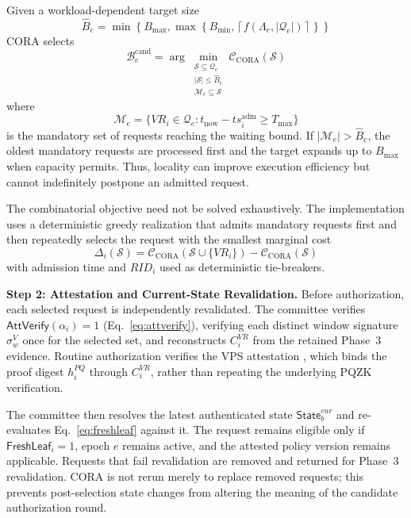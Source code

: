 \documentclass[lettersize,journal]{IEEEtran}
\begin{document}
Given a workload-dependent target size
\begin{equation}
\widehat{B}_e
=
\min\!\left\{
B_{\max},
\max\!\left\{
B_{\min},
\left\lceil
f(\Lambda_e,|\mathcal{Q}_e|)
\right\rceil
\right\}
\right\}
\end{equation}
CORA selects
\begin{equation}
\mathcal{B}_e^{\mathrm{cand}}
=
\arg\min_{\substack{
\mathcal{S}\subseteq\mathcal{Q}_e\\
|\mathcal{S}|\leq\widehat{B}_e\\
\mathcal{M}_e\subseteq\mathcal{S}
}}
\mathcal{C}_{\mathrm{CORA}}(\mathcal{S})
\end{equation}
where
\begin{equation}
\mathcal{M}_e=
\{VR_i\in\mathcal{Q}_e:
t_{\mathrm{now}}-ts_i^{\mathrm{adm}}\geq T_{\max}\}
\end{equation}
is the mandatory set of requests reaching the waiting bound. If
$|\mathcal{M}_e|>\widehat{B}_e$, the oldest mandatory requests are
processed first and the target expands up to $B_{\max}$ when capacity
permits. Thus, locality can improve execution efficiency but cannot
indefinitely postpone an admitted request.

The combinatorial objective need not be solved exhaustively. The
implementation uses a deterministic greedy realization that admits
mandatory requests first and then repeatedly selects the request with
the smallest marginal cost
\begin{equation}
\Delta_i(\mathcal{S})
=
\mathcal{C}_{\mathrm{CORA}}
(\mathcal{S}\cup\{VR_i\})
-
\mathcal{C}_{\mathrm{CORA}}(\mathcal{S})
\end{equation}
with admission time and $RID_i$ used as deterministic tie-breakers.

\medskip
\noindent\textbf{Step 2: Attestation and Current-State Revalidation.}
Before authorization, each selected request is independently
revalidated. The committee verifies
$\mathsf{AttVerify}(\alpha_i)=1$
(Eq.~\eqref{eq:attverify}), verifying each distinct window signature
$\sigma_w^{V}$ once for the selected set,
and reconstructs $C_i^{VR}$ from the retained Phase~3 evidence.
Routine authorization verifies the VPS attestation , which
binds the proof digest $h_i^{PQ}$ through $C_i^{VR}$,
rather than repeating the underlying PQZK verification.

The committee then resolves the latest authenticated state
$\mathsf{State}_b^{cur}$ and re-evaluates
Eq.~\eqref{eq:freshleaf} against it.
The request remains eligible only if
$\mathsf{FreshLeaf}_i=1$,
epoch $e$ remains active, and the attested policy version remains
applicable. Requests that fail revalidation are removed and returned
for Phase~3 revalidation. CORA is not rerun merely to replace removed
requests; this prevents post-selection state changes from altering the
meaning of the candidate authorization round.
\end{document}
